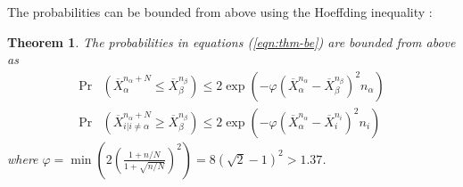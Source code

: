 \documentclass[]{article}
\newtheorem{thm}{Theorem}
\begin{document}
The probabilities can be bounded from above using the
Hoeffding inequality \cite{Hoeffding.ineq}:
\begin{thm} The probabilities in equations (\ref{eqn:thm-be}) are bounded from above as
\begin{align}
  \label{eqn:probound-blnk-hoeffding}
  \Pr&(\overline X_\alpha^{{n_\alpha}+N} \le \overline X_\beta^{n_\beta})
  \le 2\exp\left(- \varphi (\overline X_\alpha^{n_\alpha} - \overline X_\beta^{n_\beta})^2 n_\alpha
  \right)\nonumber\\
  \Pr&(\overline X_{i|i\ne\alpha}^{n_\alpha+N} \ge \overline X_\beta^{n_\beta})
  \le 2\exp\left(- \varphi (\overline X_\alpha^{n_\alpha} -\overline  X_i^{n_i})^2 n_i \right)
\end{align}
where $\varphi=\min \left(2(\frac {1+n/N} {1+\sqrt {n/N}})^2\right)=8(\sqrt 2 - 1)^2 > 1.37$.
\label{thm:hoeffding-prob-bounds}
\end{thm}
\end{document}
